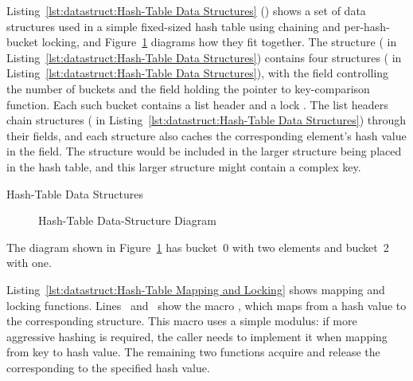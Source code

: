 \begin{fcvref}
Listing~\ref{lst:datastruct:Hash-Table Data Structures}
()
shows a set of data structures used in a simple fixed-sized hash
table using chaining and per-hash-bucket locking, and
Figure~\ref{fig:datastruct:Hash-Table Data-Structure Diagram}
diagrams how they fit together.
The  structure ( in
Listing~\ref{lst:datastruct:Hash-Table Data Structures})
contains four  structures
( in
Listing~\ref{lst:datastruct:Hash-Table Data Structures}),
with the  field controlling the number of buckets
and the  field holding the pointer to key-comparison
function.
Each such bucket contains a list header  and
a lock .
The list headers chain  structures
( in
Listing~\ref{lst:datastruct:Hash-Table Data Structures})
through their
 fields, and each  structure also caches
the corresponding element's hash value in the  field.
The  structure would be included in the larger structure
being placed in the hash table, and this larger structure might contain
a complex key.
\end{fcvref}

\begin{listing}[tb]

\caption{Hash-Table Data Structures}
\label{lst:datastruct:Hash-Table Data Structures}
\end{listing}

\begin{figure}[tb]
\centering
{}
\caption{Hash-Table Data-Structure Diagram}
\label{fig:datastruct:Hash-Table Data-Structure Diagram}
\end{figure}

The diagram shown in
Figure~\ref{fig:datastruct:Hash-Table Data-Structure Diagram}
has bucket~0 with two elements and bucket~2 with one.

\begin{fcvref}
Listing~\ref{lst:datastruct:Hash-Table Mapping and Locking}
shows mapping and locking functions.
Lines~ and~
show the macro , which maps from a hash value
to the corresponding  structure.
This macro uses a simple modulus: if more aggressive hashing is required,
the caller needs to implement it when mapping from key to hash value.
The remaining two functions acquire and release the 
corresponding to the specified hash value.
\end{fcvref}

